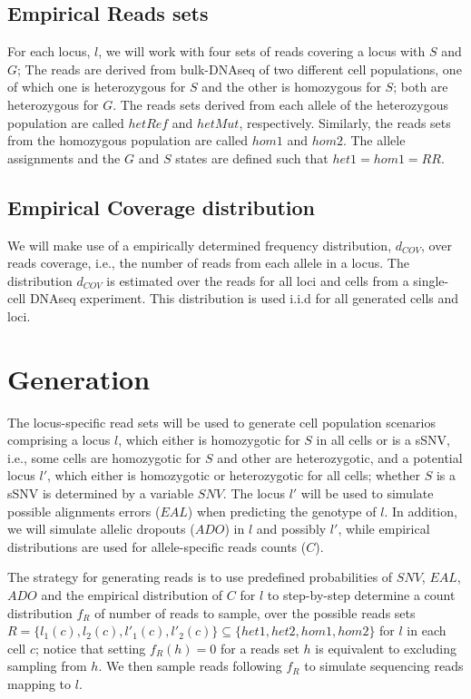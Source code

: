 \documentclass[a4paper,11pt]{article}
\begin{document}
\subsection{Empirical Reads sets}
\label{sec:reads-sets}


For each locus, $l$, we will work with four sets of reads covering a locus with $S$
and $G$; The reads are derived from bulk-DNAseq of two different cell
populations, one of which one is heterozygous for $S$ and the other is
homozygous for $S$; both are heterozygous for $G$. The reads sets
derived from each allele of the heterozygous population are called
$hetRef$ and $hetMut$, respectively. Similarly, the reads sets from the
homozygous population are called $hom1$ and $hom2$. The allele
assignments and the $G$ and $S$ states are defined such that
$het1=hom1=RR$.

\subsection{Empirical Coverage distribution}
\label{sec:cover-distr}
We will make use of a empirically determined frequency distribution,
$d_{COV}$, over reads coverage, i.e., the number of reads from each
allele in a locus. The distribution $d_{COV}$ is estimated over the
reads for all loci and cells from a single-cell DNAseq
experiment. This distribution is used i.i.d for all generated cells
and loci.


\section{Generation}
\label{sec:generation}
The locus-specific read sets will be used to generate cell population
scenarios comprising a locus $l$, which either is homozygotic for $S$
in all cells or is a sSNV, i.e., some cells are homozygotic for $S$
and other are heterozygotic, and a potential locus $l'$, which either
is homozygotic or heterozygotic for all cells; whether $S$ is a sSNV
is determined by a variable $SNV$.  The locus $l'$ will be used to
simulate possible alignments errors ($EAL$) when predicting the
genotype of $l$.
%
In addition, we will simulate allelic dropouts ($ADO$) in $l$ and
possibly $l'$, while empirical distributions are used for
allele-specific reads counts ($C$).

The strategy for generating reads is to use predefined probabilities
of $SNV$, $EAL$, $ADO$ and the empirical distribution of $C$ for $l$
to step-by-step determine a count distribution $f_R$ of number of
reads to sample, over the possible reads sets
$R=\{l_1(c), l_2(c), l'_1(c), l'_2(c)\} \subseteq \{het1, het2, hom1, hom2\}$
for $l$ in each cell $c$; notice that setting $f_R(h)=0$ for a reads
set $h$ is equivalent to excluding sampling from $h$. We then sample
reads following $f_R$ to simulate sequencing reads mapping to $l$.
\end{document}
